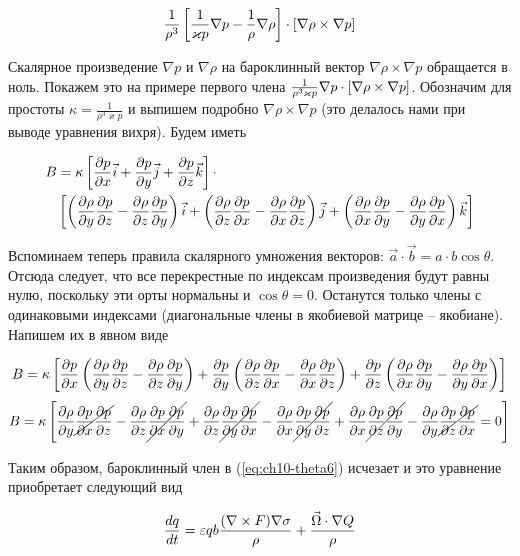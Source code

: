 \begin{equation*}
    \frac{1}{\rho^3} \qb{ \frac{1}{\varkappa p}\nabla p - \frac{1}{\rho}\nabla\rho} \cdot \qb{ \nabla\rho \times \nabla p }
\end{equation*}

Скалярное произведение $\nabla p$ и $\nabla\rho$ на бароклинный вектор $\nabla\rho\times\nabla p$ обращается в ноль. Покажем это на примере первого члена $\frac{1}{\rho^3\varkappa p} \nabla p \cdot \qb{\nabla\rho\times\nabla p}$. Обозначим для простоты $\kappa=\frac{1}{\rho^3\varkappa p}$  и выпишем подробно $\nabla\rho\times\nabla p$ (это делалось нами при выводе уравнения вихря). Будем иметь

\begin{align*}
    B &= \kappa \qb{ \pd{p}{x}\vec{i} + \pd{p}{y}\vec{j} + \pd{p}{z}\vec{k} } \cdot \\
    &\qb{ 
        \rb{ \pd{\rho}{y}\pd{p}{z} - \pd{\rho}{z}\pd{p}{y}}\vec{i} + 
        \rb{ \pd{\rho}{z}\pd{p}{x} - \pd{\rho}{x}\pd{p}{z}}\vec{j} + 
        \rb{ \pd{\rho}{x}\pd{p}{y} - \pd{\rho}{y}\pd{p}{x}}\vec{k}
    }
\end{align*}

Вспоминаем теперь правила скалярного умножения векторов: $\vec{a}\cdot\vec{b}=a\cdot b \cos{\theta}$. Отсюда следует, что все перекрестные по индексам произведения будут равны нулю, поскольку эти орты нормальны и $\cos{\theta}=0$. Останутся только члены с одинаковыми индексами (диагональные члены в якобиевой матрице -- якобиане). Напишем их в явном виде

\begin{equation*}
    B = \kappa \qb{ 
        \pd{p}{x}  \rb{ \pd{\rho}{y}\pd{p}{z}-\pd{\rho}{z}\pd{p}{y} } +
        \pd{p}{y}  \rb{ \pd{\rho}{z}\pd{p}{x}-\pd{\rho}{x}\pd{p}{z} } +
        \pd{p}{z}  \rb{ \pd{\rho}{x}\pd{p}{y}-\pd{\rho}{y}\pd{p}{x} } 
    }
\end{equation*}
\begin{equation*}
    B = \kappa \qb{ 
        \pd{\rho}{y}\cancel{\pd{p}{x}\pd{p}{z}}-\pd{\rho}{z}\cancel{\pd{p}{x}\pd{p}{y}}  +
        \pd{\rho}{z}\cancel{\pd{p}{y}\pd{p}{x}}-\pd{\rho}{x}\cancel{\pd{p}{y}\pd{p}{z}}  +
        \pd{\rho}{x}\cancel{\pd{p}{z}\pd{p}{y}}-\pd{\rho}{y}\cancel{\pd{p}{z}\pd{p}{x}}  = 0
    }
\end{equation*}

Таким образом, бароклинный член в (\ref{eq:ch10-theta6}) исчезает и это уравнение приобретает следующий вид

\begin{equation}
    \label{eq:ch10-theta9}
    \td{q}{t} = \varepsilon qb{ \frac{(\nabla\times F)\nabla\sigma}{\rho} + \frac{\vec{\Omega}\cdot\nabla Q }{\rho} }
\end{equation}

